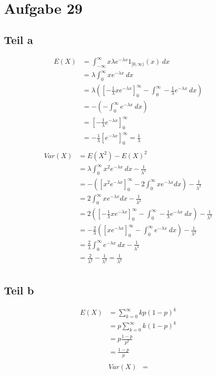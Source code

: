 \documentclass[10pt,a4paper]{article}
\begin{document}
\section{Aufgabe 29}

\subsection{Teil a}
\begin{align*}
  E(X) & = \int_{-\infty}^{\infty} x \lambda e^{-\lambda x} 1_{[0, \infty)}(x)\ dx\\
  & = \lambda \int_{0}^{\infty} x e^{-\lambda x}\ dx\\
  & = \lambda \left( \left[ -\frac{1}{\lambda} x e^{-\lambda x} \right]_{0}^{\infty} - \int_{0}^{\infty} -\frac{1}{\lambda} e^{-\lambda x}\ dx \right)\\
  & = -\left( -\int_{0}^{\infty} e^{-\lambda x}\ dx \right)\\
  & = \left[ -\frac{1}{\lambda} e^{-\lambda x} \right]_{0}^{\infty}\\
  & = -\frac{1}{\lambda} \left[ e^{-\lambda x} \right]_{0}^{\infty} = \frac{1}{\lambda}\\
\end{align*}
\begin{align*}
  Var(X) & = E(X^{2}) - E(X)^{2}\\
  & = \lambda \int_{0}^{\infty} x^{2} e^{-\lambda x}\ dx - \frac{1}{\lambda^{2}}\\
  & = -\left( \left[ x^{2}e^{-\lambda x} \right]_{0}^{\infty} - 2 \int_{0}^{\infty} x e^{-\lambda x} dx \right) - \frac{1}{\lambda^{2}}\\
  & = 2 \int_{0}^{\infty} x e^{-\lambda x} dx - \frac{1}{\lambda^{2}}\\
  & = 2 \left( \left[ -\frac{1}{\lambda} x e^{-\lambda x} \right]_{0}^{\infty} - \int_{0}^{\infty} -\frac{1}{\lambda} e^{-\lambda x}\ dx \right) - \frac{1}{\lambda^{2}}\\
  & = -\frac{2}{\lambda} \left( \left[ x e^{-\lambda x} \right]_{0}^{\infty} - \int_{0}^{\infty} e^{-\lambda x}\ dx \right) - \frac{1}{\lambda^{2}}\\
  & = \frac{2}{\lambda} \int_{0}^{\infty} e^{-\lambda x}\ dx - \frac{1}{\lambda^{2}}\\
  & = \frac{2}{\lambda^{2}} - \frac{1}{\lambda^{2}} = \frac{1}{\lambda^{2}}\\
\end{align*}

\subsection{Teil b}
\begin{align*}
  E(X) & = \sum_{k = 0}^{\infty} kp(1 - p)^{k}\\
  & = p \sum_{k = 0}^{\infty} k(1 - p)^{k}\\
  & = p \frac{1 - p}{p^{2}}\\
  & = \frac{1 - p}{p}\\
\end{align*}
\begin{align*}
  Var(X) & =
\end{align*}
\end{document}

